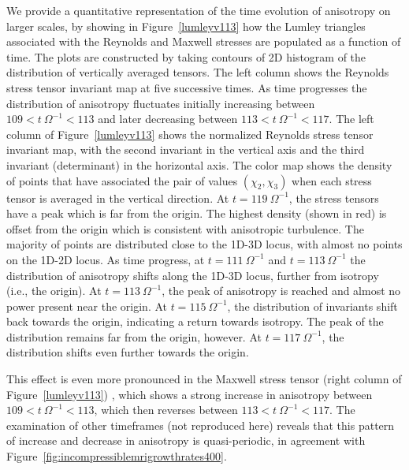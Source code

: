 \documentclass[]{emulateapj}
\begin{document}
We provide a quantitative representation of the time evolution of
anisotropy on larger scales, by showing in Figure~\ref{lumleyv113} 
how the Lumley triangles associated with the
Reynolds and Maxwell stresses are populated as a function of time.
The plots are constructed by taking contours of 2D histogram of the
distribution of vertically averaged tensors.  
The left column shows the Reynolds stress tensor invariant map at five successive times. 
As time progresses the distribution of anisotropy fluctuates initially 
increasing between $109<t~\Omega^{-1}<113$ and later decreasing between $113<t~\Omega^{-1}<117$. 
The left column of Figure~\ref{lumleyv113} shows the normalized Reynolds stress tensor invariant map, 
with the second invariant in the vertical axis and the third invariant (determinant) in the horizontal axis.
The color map shows the density of points that have associated the pair of values $(\chi_2, \chi_3)$ 
when each stress tensor is averaged in the vertical direction.
At $t=119~\Omega^{-1}$, the stress tensors have a peak which is far from the origin. The highest density (shown in red) 
is offset from the origin which is consistent with anisotropic turbulence. 
The majority of points are distributed close to the 1D-3D locus, with almost no points on the 1D-2D locus.
As time progress, at $t=111~\Omega^{-1}$ and $t=113~\Omega^{-1}$ the 
distribution of anisotropy shifts along the 1D-3D locus, further from isotropy (i.e., the origin).
At $t=113~\Omega^{-1}$, the peak of anisotropy is reached and almost no power present near the origin.
At $t=115~\Omega^{-1}$, the distribution of invariants shift back towards the origin, indicating a return towards isotropy. 
The peak of the distribution remains far from the origin, however.
At $t=117~\Omega^{-1}$, the distribution shifts even further towards the origin.


This effect is even more pronounced in the Maxwell stress tensor (right column of Figure~\ref{lumleyv113}) , 
which shows a strong increase in anisotropy between $109<t~\Omega^{-1}<113$, which then reverses between 
$113<t~\Omega^{-1}<117$. The examination of other timeframes (not reproduced here) reveals that this
pattern of increase and decrease in anisotropy is quasi-periodic, in agreement with Figure~\ref{fig:incompressiblemrigrowthrates400}.
\end{document}
